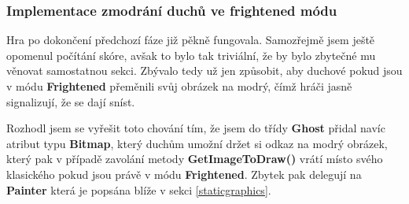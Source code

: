 \documentclass[a4]{article}
\begin{document}
\subsubsection{Implementace zmodrání duchů ve frightened módu} \label{frightenedmode}
Hra po dokončení předchozí fáze již pěkně fungovala. Samozřejmě jsem ještě opomenul počítání skóre, avšak to bylo tak triviální, že by bylo zbytečné mu věnovat samostatnou sekci. Zbývalo tedy už jen způsobit, aby duchové pokud jsou v módu \textbf{Frightened} přeměnili svůj obrázek na modrý, čímž hráči jasně signalizují, že se dají sníst. 

Rozhodl jsem se vyřešit toto chování tím, že jsem do třídy \textbf{Ghost} přidal navíc atribut typu \textbf{Bitmap}, který duchům umožní držet si odkaz na modrý obrázek, který pak v případě zavolání metody \textbf{GetImageToDraw()} vrátí místo svého klasického pokud jsou právě v módu \textbf{Frightened}. Zbytek pak delegují na \textbf{Painter} která je popsána blíže v sekci \ref{staticgraphics}.
\end{document}
